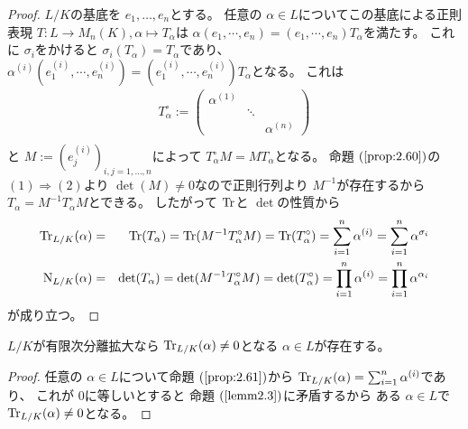 \documentclass[../master_galois_theory]{subfiles}
\begin{document}
\begin{proof}
  $L/K$の基底を $e_1 , \dots , e_n$とする。
  任意の $\alpha \in L$についてこの基底による正則表現
  $T : L \longrightarrow M_n(K) , \alpha \longmapsto T_\alpha$は
  $\alpha (e_1 , \cdots , e_n) = (e_1 , \cdots , e_n) T_\alpha$を満たす。
  これに $\sigma_i$をかけると $\sigma_i(T_\alpha) = T_\alpha$であり、
  $\alpha^{(i)} (e_1^{(i)} , \cdots , e_n^{(i)}) = (e_1^{(i)} , \cdots , e_n^{(i)}) T_\alpha$となる。
  これは
  \begin{eqnarray*}
    T_\alpha^\circ :=
    \begin{pmatrix}
      \alpha^{(1)} &        & \\
                   & \ddots & \\
                   &        & \alpha^{(n)}
    \end{pmatrix}
    \\
  \end{eqnarray*}
  と $M := (e_j^{(i)})_{i , j = 1 , \dots , n}$によって
  $T_\alpha^\circ M = M T_\alpha$となる。
  命題 $(\mathrm{\ref{prop:2.60}})$の $(1) \Rightarrow (2)$より
  $\det(M) \neq 0$なので正則行列より $M^{-1}$が存在するから
  $T_\alpha = M^{-1} T_\alpha^\circ M$とできる。
  したがって $\mathrm{Tr}$と $\det$の性質から
  \begin{eqnarray*}
    \mathrm{Tr}_{L/K}(\alpha) & = & \mathrm{Tr}(T_\alpha) = \mathrm{Tr}(M^{-1} T_\alpha^\circ M) = \mathrm{Tr}(T_\alpha^\circ) = \sum_{i=1}^n \alpha^{(i)} = \sum_{i=1}^n \alpha^{\sigma_i} \\
    \mathrm{N}_{L/K}(\alpha) & = & \det(T_\alpha) = \det(M^{-1} T_\alpha^\circ M) = \det(T_\alpha^\circ) = \prod_{i=1}^n \alpha^{(i)} = \prod_{i=1}^n \alpha^{\alpha_i}
  \end{eqnarray*}
  が成り立つ。
\end{proof}

\begin{corl}
  $L/K$が有限次分離拡大なら $\mathrm{Tr}_{L/K}(\alpha) \neq 0$となる $\alpha \in L$が存在する。
\end{corl}

\begin{proof}
  任意の $\alpha \in L$について命題 $(\mathrm{\ref{prop:2.61}})$から
  $\mathrm{Tr}_{L/K}(\alpha) = \sum_{i=1}^n \alpha^{(i)}$であり、
  これが $0$に等しいとすると
  命題 $(\mathrm{\ref{lemm2.3}})$に矛盾するから
  ある $\alpha \in L$で $\mathrm{Tr}_{L/K}(\alpha) \neq 0$となる。
\end{proof}
\end{document}
